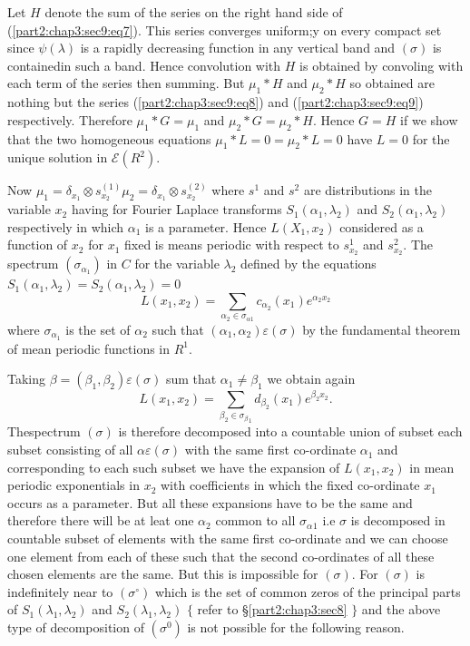 Let $H$ denote the sum of the series on the right hand side of
(\ref{part2:chap3:sec9:eq7}). This series converges uniform;y on every
compact set since 
$\psi (\lambda)$ is a rapidly decreasing function in any vertical band
and $(\sigma)$ is contained\pageoriginale in such a band. Hence
convolution with $H$ 
is obtained by convoling with each term of the series then
summing. But $\mu_1 * H $ and $\mu_2 * H$ so obtained are nothing but
the series (\ref{part2:chap3:sec9:eq8}) and
(\ref{part2:chap3:sec9:eq9}) respectively. Therefore $\mu_1 * G =
\mu_1$  
and $\mu_2 * G = \mu_2 * H$. Hence $G= H$ if we show that the two
homogeneous equations $\mu_1 * L =0 = \mu_2 * L = 0$ have $L =0$ for
the unique solution in $\mathscr{E} (R^2)$. 

Now $\mu_1 = \delta _{x_1} \otimes s_{x_{2}}^{(1)} \mu_2 =  \delta
_{x_1} \otimes s_{x_{2}}^{(2)} $ where $s^1$ and $s^2$ are
distributions in the variable $x_2$ having for Fourier Laplace
transforms $S_1 (\alpha_1, \lambda_2)$ and $S_2 (\alpha_1, \lambda_2)$
respectively in which $\alpha_1$ is a parameter. Hence $L (X_1, x_2)$
considered as a function of $x_2$ for $x_1$ fixed is means periodic
with respect to $s^1_{x_2}$ and $s^2_{x_2}$. The spectrum
$(\sigma_{\alpha_1})$ in $C$ for the variable $\lambda_2$ defined by the
equations $S_1 (\alpha_1, \lambda_2) = S_2 (\alpha_1, \lambda_2) =0$ 
$$
L (x_1,x_2) = \sum_{\alpha_2 \in \sigma_{\alpha 1}}
c_{\alpha{_2}} (x_1) e^{\alpha_2 x_2} 
$$
where $\sigma_{\alpha{_1}}$ is the set of $\alpha_2$ such that
$(\alpha_1, \alpha_2) \varepsilon (\sigma)$ by the fundamental theorem
of mean periodic functions in $R^1$.  

Taking $\beta = (\beta_1, \beta_2) \varepsilon (\sigma)$ sum that
$\alpha_1 \neq \beta_1$ we obtain again 
$$
L (x_1,x_2) = \sum_{\beta_2 \in \sigma{_\beta}_1}
d_{\beta_{2}} (x_1) e^{\beta_2 x_2}. 
$$
The\pageoriginale spectrum $(\sigma)$ is therefore decomposed into a countable union
of subset each subset consisting of all $\alpha \varepsilon (\sigma)$
with the same first co-ordinate $\alpha_1$ and corresponding to each
such subset we have the expansion of $L (x_1, x_2)$ in mean periodic
exponentials in $x_2$ with coefficients in which the fixed co-ordinate
$x_1$ occurs as a parameter. But all these expansions have to be the
same and therefore there will be at leat one $\alpha_2$ common to all
$\sigma{_\alpha{_1}}$ i.e $\sigma$ is decomposed in countable subset of
elements with the same first co-ordinate and we can choose one element
from each of these such that the second co-ordinates 
of all these chosen elements are the same. But this is
impossible for $(\sigma)$. For $(\sigma)$ is indefinitely near to
$(\sigma^\circ)$ which is the set of common zeros of the principal parts of
$S_1 (\lambda_1, \lambda_2)$ and $S_2 (\lambda_1, \lambda_2)$ $\{$ refer
to \S \ref{part2:chap3:sec8} $\}$ and the above type of decomposition
of $(\sigma^0)$ is not possible for the following reason. 

